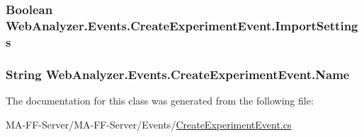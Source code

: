 \subsubsection[{Import\+Settings}]{\setlength{\rightskip}{0pt plus 5cm}Boolean Web\+Analyzer.\+Events.\+Create\+Experiment\+Event.\+Import\+Settings\hspace{0.3cm}{\ttfamily [get]}}\label{class_web_analyzer_1_1_events_1_1_create_experiment_event_ad7acdf21b15a8eb496b29b2ee4cd5d35}
\hypertarget{class_web_analyzer_1_1_events_1_1_create_experiment_event_a6e6e3eee6e63143be6e5ab7b329533c6}{}
\subsubsection[{Name}]{\setlength{\rightskip}{0pt plus 5cm}String Web\+Analyzer.\+Events.\+Create\+Experiment\+Event.\+Name\hspace{0.3cm}{\ttfamily [get]}}\label{class_web_analyzer_1_1_events_1_1_create_experiment_event_a6e6e3eee6e63143be6e5ab7b329533c6}


The documentation for this class was generated from the following file\+:\begin{DoxyCompactItemize}
\item 
M\+A-\/\+F\+F-\/\+Server/\+M\+A-\/\+F\+F-\/\+Server/\+Events/\hyperlink{_create_experiment_event_8cs}{Create\+Experiment\+Event.\+cs}\end{DoxyCompactItemize}
